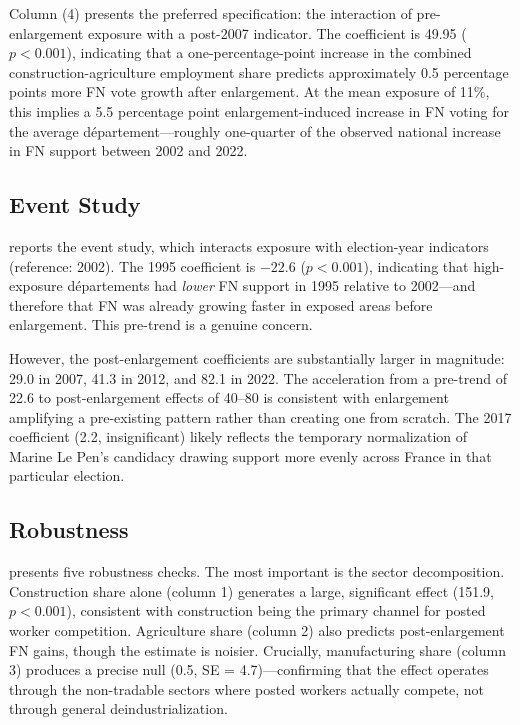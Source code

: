 \documentclass[12pt]{article}
\begin{document}
Column (4) presents the preferred specification: the interaction of pre-enlargement exposure with a post-2007 indicator. The coefficient is 49.95 ($p < 0.001$), indicating that a one-percentage-point increase in the combined construction-agriculture employment share predicts approximately 0.5 percentage points more FN vote growth after enlargement. At the mean exposure of 11\%, this implies a 5.5 percentage point enlargement-induced increase in FN voting for the average d\'epartement---roughly one-quarter of the observed national increase in FN support between 2002 and 2022.



\subsection{Event Study}

 reports the event study, which interacts exposure with election-year indicators (reference: 2002). The 1995 coefficient is $-22.6$ ($p < 0.001$), indicating that high-exposure d\'epartements had \emph{lower} FN support in 1995 relative to 2002---and therefore that FN was already growing faster in exposed areas before enlargement. This pre-trend is a genuine concern.

However, the post-enlargement coefficients are substantially larger in magnitude: 29.0 in 2007, 41.3 in 2012, and 82.1 in 2022. The acceleration from a pre-trend of 22.6 to post-enlargement effects of 40--80 is consistent with enlargement amplifying a pre-existing pattern rather than creating one from scratch. The 2017 coefficient (2.2, insignificant) likely reflects the temporary normalization of Marine Le Pen's candidacy drawing support more evenly across France in that particular election.



\subsection{Robustness}

 presents five robustness checks. The most important is the sector decomposition. Construction share alone (column 1) generates a large, significant effect (151.9, $p < 0.001$), consistent with construction being the primary channel for posted worker competition. Agriculture share (column 2) also predicts post-enlargement FN gains, though the estimate is noisier. Crucially, manufacturing share (column 3) produces a precise null (0.5, SE = 4.7)---confirming that the effect operates through the non-tradable sectors where posted workers actually compete, not through general deindustrialization.
\end{document}
